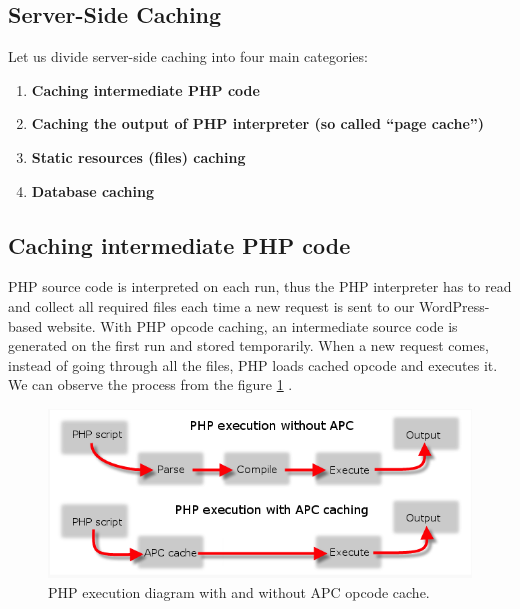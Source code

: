 \subsection{Server-Side Caching}

Let us divide server-side \gls{caching} into four main categories:

\begin{enumerate}
    \item\textbf{Caching intermediate PHP code}
    \item\textbf{Caching the output of PHP interpreter (so called “page cache”)}
    \item\textbf{Static resources (files) caching}
    \item\textbf{Database caching}
  \end{enumerate}

\subsection*{Caching intermediate PHP code}

PHP source code is interpreted on each run, thus the PHP interpreter has to read and collect all required files each time a new request is sent to our WordPress-based website. With PHP \gls{opcode} caching, an intermediate source code is generated on the first run and stored temporarily. When a new request comes, instead of going through all the files, PHP loads cached opcode and executes it. We can observe the process from the figure \ref{fig:php-opcode-caching} \cite{Fig:PHP-opcode-caching}.

\begin{figure}[H]
\begin{center}
\includegraphics[scale=0.5]{figures/php-opcode-caching.png}
\caption{PHP execution diagram with and without APC opcode cache.}
\label{fig:php-opcode-caching}
\end{center}
\end{figure}

